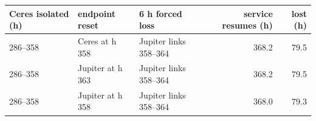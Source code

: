 \begin{tabular}{lllrr}
\toprule
Ceres isolated (h) & endpoint reset & 6 h forced loss & service resumes (h) & lost (h)\\
\midrule
286--358 & Ceres at h 358 & Jupiter links 358--364 & 368.2 & 79.5\\
286--358 & Jupiter at h 363 & Jupiter links 358--364 & 368.2 & 79.5\\
286--358 & Jupiter at h 358 & Jupiter links 358--364 & 368.0 & 79.3\\
\bottomrule
\end{tabular}
